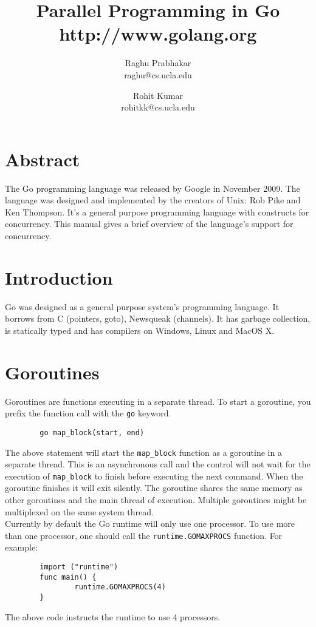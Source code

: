 \documentclass[8pt, twocolumn]{article}
\title{Parallel Programming in Go \\
\small{http://www.golang.org}
}
\author{
  Raghu Prabhakar
  \\raghu@cs.ucla.edu
  \and 
  Rohit Kumar 
  \\rohitkk@cs.ucla.edu
}
\begin{document}
\maketitle
\section{Abstract}
The Go programming language was released by Google in November
2009. The language was designed and implemented by the creators of
Unix: Rob Pike and Ken Thompson. It's a general purpose programming
language with constructs for concurrency. This manual gives a brief
overview of the language's support for concurrency.\\
\section{Introduction}
Go was designed as a general purpose system's programming language. It
borrows from C (pointers, goto), Newsqueak (channels). It has garbage
collection, is statically typed and has compilers on Windows, Linux
and MacOS X. 
\section{Goroutines}
Goroutines are functions executing in a separate thread. To start a
goroutine, you prefix the function call with the \verb=go= keyword.
\begin{verbatim}
        go map_block(start, end)
\end{verbatim}
The above statement will start the \verb=map_block= function as a
goroutine in a separate thread. This is an asynchronous call and the
control will not wait for the execution of \verb=map_block= to finish
before executing the next command. When the goroutine finishes it will
exit silently. The goroutine shares the same memory
as other goroutines and the main thread of execution. Multiple
goroutines might be multiplexed on the same system thread.\\

Currently by default the Go runtime will only use one processor. To
use more than one processor, one should call the
\verb=runtime.GOMAXPROCS= function. For example:
\begin{verbatim}
        import ("runtime")        
        func main() {
                runtime.GOMAXPROCS(4)
        }
\end{verbatim}
The above code instructs the runtime to use 4 processors.
\end{document}

